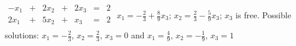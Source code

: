 {$\begin{array}{ccccccc}
-x_1&+&2x_2&+&2x_3&=&2\\
2x_1&+&5x_2&+&x_3&=&2\\
\end{array}$}
{$x_1=-\frac23+\frac89x_3$; $x_2=\frac23-\frac59x_3$; $x_3$ is free. Possible solutions: $x_1 = -\frac23$, $x_2 = \frac23$, $x_3 = 0$ and $x_1 = \frac49$, $x_2 = -\frac19$, $x_3 = 1$}